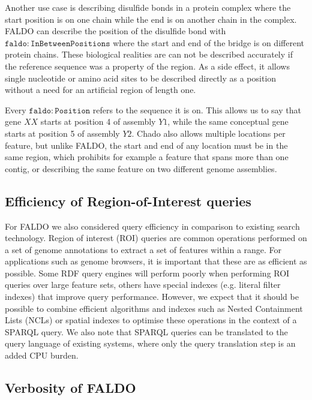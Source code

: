 Another use case is describing disulfide bonds in a protein complex where the start position is on one chain while the end is on another chain in the complex.
FALDO can describe the position of the disulfide bond with $\mathtt{faldo\colon{}InBetweenPositions}$ where the start and end of the bridge is on different protein chains.
These biological realities are can not be described accurately if the reference sequence was a property of the region. 
As a side effect, it allows single nucleotide or amino acid sites to be described directly as a position without a need for an artificial region of length one.

Every $\mathtt{faldo\colon{}Position}$ refers to the sequence it is on.
This allows us to say that gene $XX$ starts at position 4 of assembly $Y1$,
while the same conceptual gene starts at position 5 of assembly $Y2$.
Chado also allows multiple locations per feature, but unlike FALDO,
the start and end of any location must be in the same region,
which prohibits for example a feature that spans more than one contig,
or describing the same feature on two different genome assemblies.

\subsection*{Efficiency of Region-of-Interest queries}

For FALDO we also considered query efficiency in comparison to existing search technology. 
Region of interest (ROI) queries are common operations performed on a
set of genome annotations to extract a set of features within a
range. For applications such as genome browsers, it is important that
these are as efficient as possible. Some RDF query engines will
perform poorly when performing ROI queries over large feature
sets, others have special indexes (e.g. literal filter indexes) 
that improve query performance. However, we expect that it should be possible to combine
efficient algorithms and indexes such as Nested Containment Lists
(NCLs)\cite{NCL2007} or spatial indexes to optimise these operations
in the context of a SPARQL query. We also note that SPARQL queries can
be translated to the query language of existing systems, where only 
the query translation step is an added CPU burden.

\subsection*{Verbosity of FALDO}

